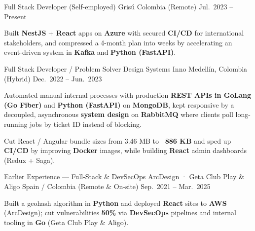 \begin{cventries}
  \cventry
  {Full Stack Developer (Self-employed)}
  {Grisú}
  {Colombia (Remote)}
  {Jul.\ 2023 -- Present}
  {
    \begin{cvitems}
      \item {Built \textbf{NestJS} + \textbf{React} apps on \textbf{Azure} with secured \textbf{CI/CD} for international stakeholders, and compressed a 4-month plan into weeks by accelerating an event-driven system in \textbf{Kafka} and \textbf{Python (FastAPI)}.}
    \end{cvitems}
  }

  \cventry
  {Full Stack Developer / Problem Solver}
  {Design Systems Inno}
  {Medellín, Colombia (Hybrid)}
  {Dec.\ 2022 -- Jun.\ 2023}
  {
    \begin{cvitems}
      \item {Automated manual internal processes with production \textbf{REST APIs in GoLang (Go Fiber)} and \textbf{Python (FastAPI)} on \textbf{MongoDB}, kept responsive by a decoupled, asynchronous \textbf{system design} on \textbf{RabbitMQ} where clients poll long-running jobs by ticket ID instead of blocking.}
      \item {Cut React / Angular bundle sizes from 3.46 MB to \textbf{~886 KB} and sped up \textbf{CI/CD} by improving \textbf{Docker} images, while building \textbf{React} admin dashboards (Redux + Saga).}
    \end{cvitems}
  }

  \cventry
  {Earlier Experience --- Full-Stack \& DevSecOps}
  {ArcDesign · Geta Club Play \& Aligo}
  {Spain / Colombia (Remote \& On-site)}
  {Sep.\ 2021 -- Mar.\ 2025}
  {
    \begin{cvitems}
      \item {Built a geohash algorithm in \textbf{Python} and deployed \textbf{React} sites to \textbf{AWS} (ArcDesign); cut vulnerabilities \textbf{50\%} via \textbf{DevSecOps} pipelines and internal tooling in \textbf{Go} (Geta Club Play \& Aligo).}
    \end{cvitems}
  }

\end{cventries}
